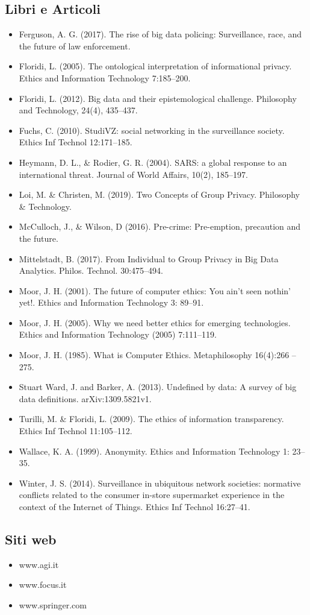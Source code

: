 \subsection*{Libri e Articoli}
\begin{itemize}

\item
Ferguson, A. G. (2017). The rise of big data policing: Surveillance, race, and the future of law enforcement.
\item
Floridi, L. (2005). The ontological interpretation of informational privacy. Ethics and Information Technology 7:185–200.
\item
Floridi, L. (2012). Big data and their epistemological challenge. Philosophy and Technology, 24(4), 435–437.
\item
Fuchs, C. (2010). StudiVZ: social networking in the surveillance society. Ethics Inf Technol 12:171–185.
\item
Heymann, D. L., \& Rodier, G. R. (2004). SARS: a global response to an international threat. Journal of World Affairs, 10(2), 185–197.
\item
Loi, M. \& Christen, M. (2019). Two Concepts of Group Privacy. Philosophy \& Technology.
\item
McCulloch, J., \& Wilson, D (2016). Pre-crime: Pre-emption, precaution and the future.
\item
Mittelstadt, B. (2017). From Individual to Group Privacy in Big Data Analytics. Philos. Technol. 30:475–494.
\item
Moor, J. H. (2001). The future of computer ethics: You ain’t seen nothin’ yet!. Ethics and Information Technology 3: 89–91.
\item
Moor, J. H. (2005). Why we need better ethics for emerging technologies. Ethics and Information Technology (2005) 7:111–119.
\item
Moor, J. H. (1985). What is Computer Ethics. Metaphilosophy 16(4):266 – 275.
\item
Stuart Ward, J. and Barker, A. (2013). Undefined by data: A survey of big data definitions. arXiv:1309.5821v1.
\item
Turilli, M. \& Floridi, L. (2009). The ethics of information transparency. Ethics Inf Technol 11:105–112.
\item
Wallace, K. A. (1999). Anonymity. Ethics and Information Technology 1: 23–35.
\item
Winter, J. S. (2014). Surveillance in ubiquitous network societies: normative conflicts related to the consumer in-store supermarket experience in the context of the Internet of Things. Ethics Inf Technol 16:27–41.

\end{itemize}

\subsection*{Siti web}
\begin{itemize}

\item
www.agi.it
\item
www.focus.it
\item
www.springer.com

\end{itemize}